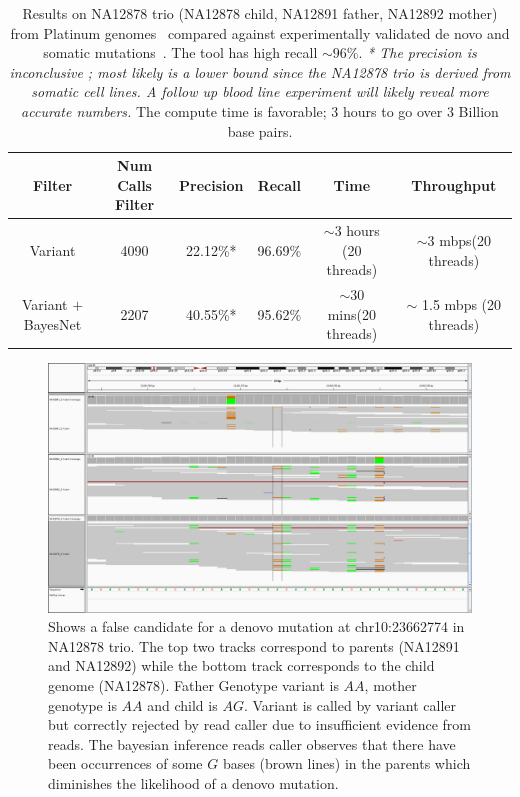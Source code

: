 \documentclass{article}
\begin{document}
\begin{table}
    \label{tab:NA12878}
    \centering
    \begin{tabular}{ | c | c | c | c | c | c |}
    \hline
    \textbf{Filter} & \textbf{Num Calls Filter} & \textbf{Precision} & \textbf{Recall }& \textbf{Time} & \textbf{Throughput} \\ \hline
	Variant & 4090 & 22.12\%* & 96.69\% & $\sim$3 hours (20 threads) & $\sim$3 mbps(20 threads) \\\hline
	Variant $+$ BayesNet & 2207 & 40.55\%* & 95.62\% & $\sim$30 mins(20 threads) & $\sim$ 1.5 mbps
(20 threads) \\
    \hline
    \end{tabular}
    \caption{Results on NA12878 trio (NA12878 child, NA12891 father, NA12892 mother) from Platinum genomes~\cite{platinum} compared against experimentally validated de novo and somatic mutations~\cite{Conrad2011}. The tool has high recall $\sim 96\%$. \textit{* The precision is inconclusive ; most likely is a lower bound since the NA12878 trio is derived from somatic cell lines. A follow up blood line experiment will likely reveal more accurate numbers.} The compute time is favorable; 3 hours to go over 3 Billion base pairs. }
\end{table}

\begin{figure}[!ht]
  \centering
  \includegraphics[width=6in]{chr10_23662774.png}
  \caption{Shows a false candidate for a denovo mutation at chr10:23662774 in NA12878 trio. The top two tracks correspond to parents (NA12891 and NA12892) while the bottom track corresponds to the child genome (NA12878). Father Genotype variant is $AA$, mother genotype is $AA$ and child is $AG$. Variant is called by variant caller but correctly rejected by read caller due to insufficient evidence from reads. The bayesian inference reads caller observes that there have been occurrences of some $G$ bases (brown lines) in the parents which diminishes the likelihood of a denovo mutation.}
   \label{fig:variant_caller}
\end{figure}
\end{document}
